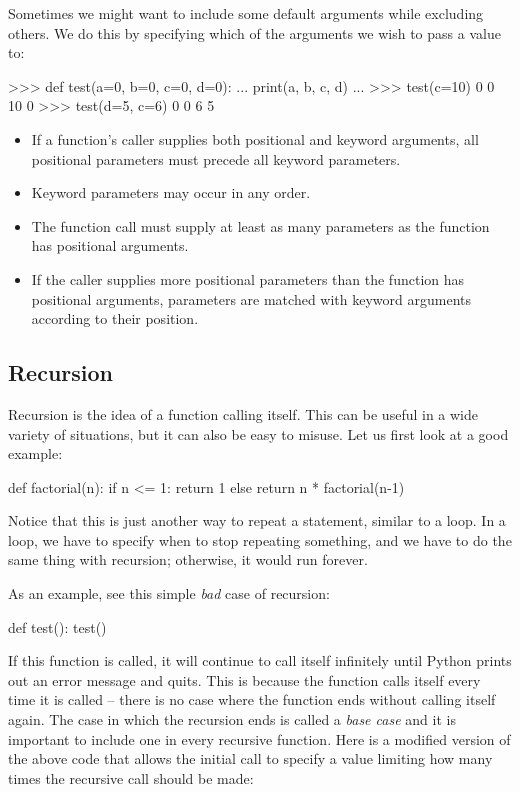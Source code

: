 \documentclass[11pt]{cselabheader}
\begin{document}
{Sometimes we might want to include some default arguments while excluding
others. We do this by specifying which of the arguments we wish to pass a value
to:

\begin{pyconcode}
>>> def test(a=0, b=0, c=0, d=0):
...     print(a, b, c, d)
...
>>> test(c=10)
0 0 10 0
>>> test(d=5, c=6)
0 0 6 5
\end{pyconcode}

\begin{itemize}
  \item If a function's caller supplies both positional and keyword arguments,
    all positional parameters must precede all keyword parameters.
  \item Keyword parameters may occur in any order.
  \item The function call must supply at least as many parameters as the
    function has positional arguments.
  \item If the caller supplies more positional parameters than the function has
    positional arguments, parameters are matched with keyword arguments
    according to their position.
\end{itemize}

\subsection{Recursion}
\label{subsec:adv.recursion}

Recursion is the idea of a function calling itself. This can be useful in a wide
variety of situations, but it can also be easy to misuse. Let us first look at a
good example:
\begin{python3code}
def factorial(n):
    if n <= 1:
        return 1
    else
        return n * factorial(n-1)
\end{python3code}

Notice that this is just another way to repeat a statement, similar to a loop.
In a loop, we have to specify when to stop repeating something, and we have to
do the same thing with recursion; otherwise, it would run forever.

As an example, see this simple \emph{bad} case of recursion:

\begin{python3code}
def test():
    test()
\end{python3code}

If this function is called, it will continue to call itself infinitely until
Python prints out an error message and quits. This is because the function calls
itself every time it is called -- there is no case where the function ends
without calling itself again. The case in which the recursion ends is called a
\emph{base case} and it is important to include one in every recursive function.
Here is a modified version of the above code that allows the initial call to
specify a value limiting how many times the recursive call should be made:

}
\end{document}
